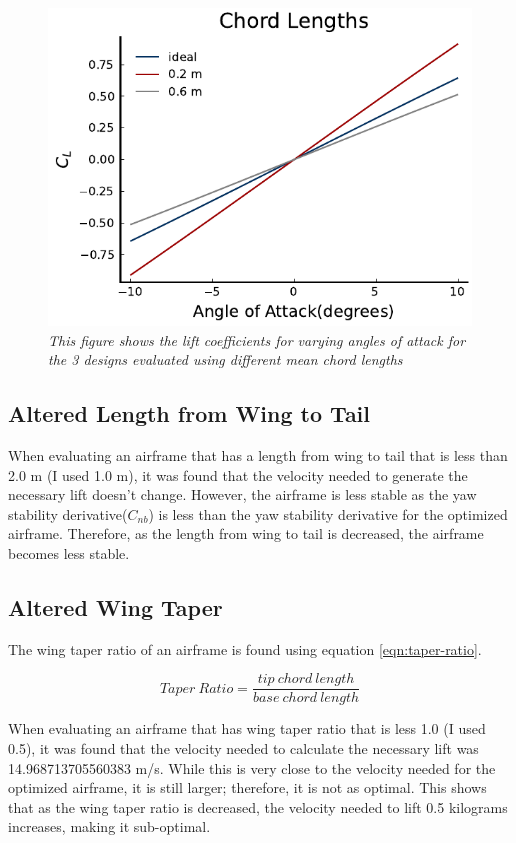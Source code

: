 \documentclass{journal}
\begin{document}
	\begin{figure}[H]
		\includegraphics{../graphics/chord_lengths.pdf}
		\caption{\emph{This figure shows the lift coefficients for varying angles of attack for the 3 designs evaluated using different mean chord lengths}}
		\label{fig:chords}
	\end{figure}
	
	\subsection{Altered Length from Wing to Tail}
	
	When evaluating an airframe that has a length from wing to tail that is less than 2.0 m (I used 1.0 m), it was found that the velocity needed to generate the necessary lift doesn't change. However, the airframe is less stable as the yaw stability derivative(\(C_{nb}\)) is less than the yaw stability derivative for the optimized airframe. Therefore, as the length from wing to tail is decreased, the airframe becomes less stable.
	
	\subsection{Altered Wing Taper}
	The wing taper ratio of an airframe is found using equation \ref{eqn:taper-ratio}.
	
	\begin{equation}
		Taper\ Ratio = \frac{tip\ chord\ length}{base\ chord\ length}
		\label{eqn:taper-ratio}
	\end{equation}
	
	When evaluating an airframe that has wing taper ratio that is less 1.0 (I used 0.5), it was found that the velocity needed to calculate the necessary lift was 14.968713705560383 m/s. While this is very close to the velocity needed for the optimized airframe, it is still larger; therefore, it is not as optimal. This shows that as the wing taper ratio is decreased, the velocity needed to lift 0.5 kilograms increases, making it sub-optimal.\\
	
\end{document}
